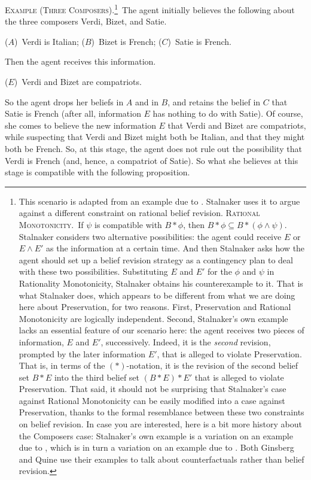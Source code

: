 	\xm \textsc{Example (Three Composers).}\footnote
		{
		This scenario is adapted from an example due to \citet{stalnaker1994nonmonotonic}. Stalnaker uses it to argue against a different constraint on rational belief revision. \op 
			\xm \textsc{Rational Monotonicity.}\, If $\psi$ is compatible with $B * \phi$, then $B * \phi \subseteq B * (\phi \wedge \psi)$. 
		\ed Stalnaker considers two alternative possibilities: the agent could receive $E$ or $E\wedge E'$ as the information at a certain time. And then Stalnaker asks how the agent should set up a belief revision strategy as a contingency plan to deal with these two possibilities. Substituting $E$ and $E'$ for the $\phi$ and $\psi$ in Rationality Monotonicity, Stalnaker obtains his counterexample to it. That is what Stalnaker does, which appears to be different from what we are doing here about Preservation, for two reasons. First, Preservation and Rational Monotonicity are logically independent. Second, Stalnaker's own example lacks an essential feature of our scenario here: the agent receives two pieces of information, $E$ and $E'$, successively. Indeed, it is the {\em second} revision, prompted by the later information $E'$, that is alleged to violate Preservation. That is, in terms of the $(*)$-notation, it is the revision of the second belief set $B * E$ into the third belief set $(B * E) * E'$ that is alleged to violate Preservation.  That said, it should not be surprising that Stalnaker's case against Rational Monotonicity can be easily modified into a case against Preservation, thanks to the formal resemblance between these two constraints on belief revision. In case you are interested, here is a bit more history about the Composers case: Stalnaker's own example is a variation on an example due to \citet{ginsberg1986counterfactuals}, which is in turn a variation on an example due to \citet{quine1982methods}. Both Ginsberg and Quine use their examples to talk about counterfactuals rather than belief revision.
		}\,
	The agent initially believes the following about the three composers Verdi, Bizet, and Satie. \op

		\xm ($A$)\, Verdi is Italian;
		\xm ($B$)\, Bizet is French;
		\xm ($C$)\, Satie is French. 

	\ed Then the agent receives this information. \op

		\xm ($E$)\, Verdi and Bizet are compatriots. 

	\ed So the agent drops her beliefs in $A$ and in $B$, and retains the belief in $C$ that Satie is French (after all, information $E$ has nothing to do with Satie). Of course, she comes to believe the new information $E$ that Verdi and Bizet are compatriots, while suspecting that Verdi and Bizet might both be Italian, and that they might both be French. So, at this stage, the agent does not rule out the possibility that Verdi is French (and, hence, a compatriot of Satie). So what she believes at this stage is compatible with the following proposition. \op

